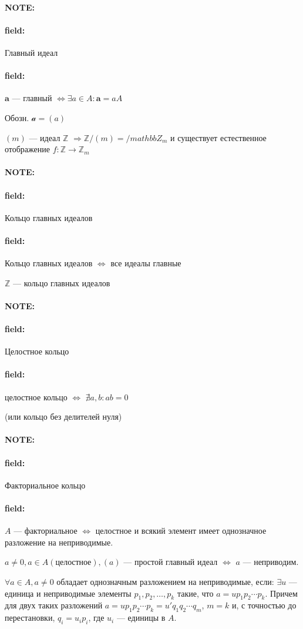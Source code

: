 \documentclass[12pt]{article}
\newenvironment{note}{\paragraph{NOTE:}}{}
\newenvironment{field}{\paragraph{field:}}{}
\begin{document}
\begin{note}
  \begin{field}
    Главный идеал
  \end{field}
  \begin{field}
    $\mathbf{a}$ --- главный
    $\Leftrightarrow \exists a \in A: \mathbf{a} = aA$

    Обозн. $\mathcal{a} = (a)$

    $(m)$ --- идеал $\mathbb{Z}$ $\Rightarrow \mathbb{Z}/(m) = /mathbb{Z}_{m}$ и
    существует естественное отображение
    $f : \mathbb{Z} \rightarrow \mathbb{Z}_{m}$
  \end{field}
\end{note}

\begin{note}
  \begin{field}
    Кольцо главных идеалов
  \end{field}
  \begin{field}
    Кольцо главных идеалов $\Leftrightarrow$
    все идеалы главные

    $\mathbb{Z}$ --- кольцо главных идеалов
  \end{field}
\end{note}

\begin{note}
  \begin{field}
    Целостное кольцо
  \end{field}
  \begin{field}
    целостное кольцо $\Leftrightarrow$ $\nexists a, b: ab=0$

    (или кольцо без делителей нуля)
  \end{field}
\end{note}

\begin{note}
  \begin{field}
    Факториальное кольцо
  \end{field}
  \begin{field}
    $A$ --- факториальное $\Leftrightarrow$ целостное и всякий элемент имеет
    однозначное разложение на неприводимые.

    $a \neq 0, a \in A (целостное), (a)$ --- простой главный идеал
    $\Leftrightarrow$ $a$ --- неприводим.

    $\forall a \in A, a \neq 0$ обладает однозначным разложением на
    неприводимые, если: $\exists u$ --- единица и неприводимые элементы
    $p_{1}, p_{2}, \ldots, p_{k}$ такие, что $a = up_{1}p_{2}\cdots p_{k}$.
    Причем для двух таких разложений
    $a = u p_{1}p_{2}\cdots p_{k} = u' q_{1} q_{2} \cdots q_{m}$,
    $m = k$ и, с точностью до перестановки,
    $q_{i} = u_{i}p_{i}$, где $u_{i}$ --- единицы в $A$.
  \end{field}
\end{note}
\end{document}
